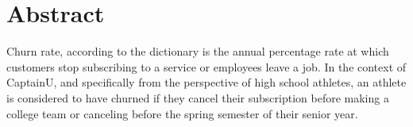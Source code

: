\documentclass[
10pt, %
a4paper, %
oneside, %
headinclude,footinclude, %
BCOR5mm, %
]{scrartcl}
\title{\normalfont\spacedallcaps{Data Science Practicum: Predicting Churn}} %
\author{\spacedlowsmallcaps{James Mwakichako \& Manoj Kumar}} %
\date{} %
\begin{document}

\renewcommand{\sectionmark}[1]{\markright{\spacedlowsmallcaps{#1}}} %
\lehead{\mbox{\llap{\small\thepage\kern1em\color{halfgray} \vline}\color{halfgray}\hspace{0.5em}\rightmark\hfil}} %

\pagestyle{scrheadings} %


\maketitle %

\setcounter{tocdepth}{2} %

\tableofcontents %

\listoffigures %

\listoftables %


\section*{Abstract}  %

Churn rate, according to the dictionary is the annual percentage rate at which customers stop subscribing to a service or employees leave a job. In the context of CaptainU, and specifically from the perspective of high school athletes, an athlete is considered to have churned if they cancel their subscription before making a college team or canceling before the spring semester of their senior year.  
\end{document}
